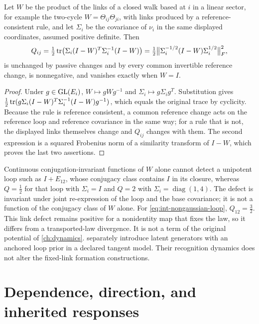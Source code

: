 Let $W$ be the product of the links of a closed walk based at $i$ in a linear sector, for example the two-cycle $W=\Theta_{ij}\Theta_{ji}$, with links produced by a reference-consistent rule, and let $\Sigma_i$ be the covariance of $\nu_i$ in the same displayed coordinates, assumed positive definite. Then
\begin{equation}
Q_{ij}=\tfrac12\operatorname{tr}\bigl(\Sigma_i(I-W)^T\Sigma_i^{-1}(I-W)\bigr)
=\tfrac12\bigl\Vert\Sigma_i^{-1/2}(I-W)\Sigma_i^{1/2}\bigr\Vert_F^2,
\label{eq:int-loop-defect}
\end{equation}
is unchanged by passive changes and by every common invertible reference change, is nonnegative, and vanishes exactly when $W=I$.
\begin{proof}
Under $g\in\mathrm{GL}(E_i)$, $W\mapsto gWg^{-1}$ and $\Sigma_i\mapsto g\Sigma_ig^T$. Substitution gives $\tfrac12\operatorname{tr}(g\Sigma_i(I-W)^T\Sigma_i^{-1}(I-W)g^{-1})$, which equals the original trace by cyclicity. Because the rule is reference consistent, a common reference change acts on the reference loop and reference covariance in the same way; for a rule that is not, the displayed links themselves change and $Q_{ij}$ changes with them. The second expression is a squared Frobenius norm of a similarity transform of $I-W$, which proves the last two assertions.
\end{proof}
Continuous conjugation-invariant functions of $W$ alone cannot detect a unipotent loop such as $I+E_{12}$, whose conjugacy class contains $I$ in its closure, whereas $Q=\tfrac12$ for that loop with $\Sigma_i=I$ and $Q=2$ with $\Sigma_i=\operatorname{diag}(1,4)$. The defect is invariant under joint re-expression of the loop and the base covariance; it is not a function of the conjugacy class of $W$ alone. For \cref{eq:int-nongaussian-loop}, $Q_{12}=\tfrac32$. This link defect remains positive for a nonidentity map that fixes the law, so it differs from a transported-law divergence. It is not a term of the original potential of \cref{ch:dynamics}.  separately introduce latent generators with an anchored loop prior in a declared tangent model. Their recognition dynamics does not alter the fixed-link formation constructions.

\section{Dependence, direction, and inherited responses}

